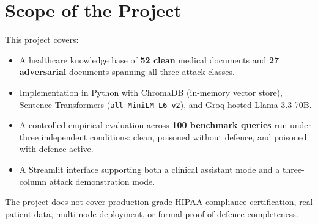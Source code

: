 \section{Scope of the Project}

This project covers:
\begin{itemize}
    \item A healthcare knowledge base of \textbf{52 clean} medical documents and \textbf{27 adversarial} documents spanning all three attack classes.
    \item Implementation in Python with ChromaDB (in-memory vector store), Sentence-Transformers (\texttt{all-MiniLM-L6-v2}), and Groq-hosted Llama 3.3 70B.
    \item A controlled empirical evaluation across \textbf{100 benchmark queries} run under three independent conditions: clean, poisoned without defence, and poisoned with defence active.
    \item A Streamlit interface supporting both a clinical assistant mode and a three-column attack demonstration mode.
\end{itemize}

The project does not cover production-grade HIPAA compliance certification, real patient data, multi-node deployment, or formal proof of defence completeness.

